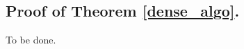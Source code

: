 \documentclass[11pt]{article}
\DeclareMathOperator*{\Ham}{Ham}
\newcommand{\Z}{\mathbb{Z}}
\renewcommand{\O}{\mathcal{O}}
\newcommand{\set}[1]{\left\lbrace #1 \right\rbrace}
\theoremstyle{plain}
\newtheorem{theorem}{Theorem}
\newtheorem{lemma}{Lemma}
\theoremstyle{definition}
\theoremstyle{remark}
\begin{document}
\subsection{Proof of Theorem \ref{dense_algo}.}

To be done.
%	
\end{document}
